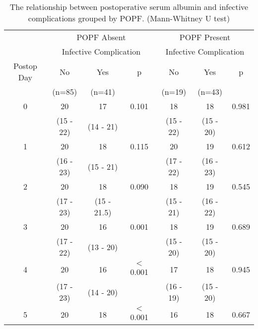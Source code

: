 \begin{table}[b]
	\centering
	\caption{The relationship between postoperative serum albumin and infective complications grouped by POPF. (Mann-Whitney U test)}
	\label{table:crp_comp_Albumin_vs_infections_popf_y1n0}
	\begin{tabular}{| c | c c c | c c c |}
		\hline
		           &       \multicolumn{3}{c|}{POPF Absent}       &      \multicolumn{3}{c|}{POPF Present}       \\
		           & \multicolumn{3}{c|}{Infective Complication} & \multicolumn{3}{c|}{Infective Complication} \\
		Postop Day & No        & Yes         & p                  & No        & Yes       & p                    \\
		           & (n=85)    & (n=41)      &                    & (n=19)    & (n=43)    &  \\ \hline
		0          & 20        & 17          & 0.101              & 18        & 18        & 0.981                \\
		           & (15 - 22) & (14 - 21)   &                    & (15 - 22) & (15 - 20) &  \\
		1          & 20        & 18          & 0.115              & 20        & 19        & 0.612                \\
		           & (16 - 23) & (15 - 21)   &                    & (17 - 22) & (16 - 23) &  \\
		2          & 20        & 18          & 0.090              & 18        & 19        & 0.545                \\
		           & (17 - 23) & (15 - 21.5) &                    & (15 - 21) & (16 - 22) &  \\
		3          & 20        & 16          & 0.001              & 18        & 19        & 0.689                \\
		           & (17 - 22) & (13 - 20)   &                    & (15 - 20) & (15 - 20) &  \\
		4          & 20        & 16          & $<$0.001           & 17        & 18        & 0.945                \\
		           & (17 - 23) & (14 - 20)   &                    & (16 - 19) & (15 - 20) &  \\
		5          & 20        & 18          & $<$0.001           & 16        & 18        & 0.667                \\

\end{tabular}
\end{table}
